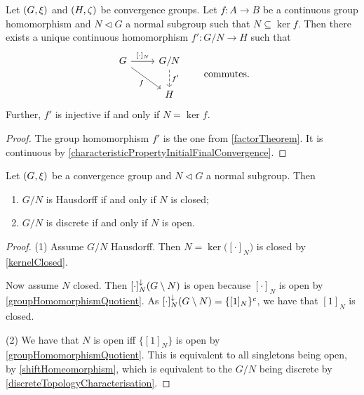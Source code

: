 \begin{lemma}
Let $\sSet{G, \xi}$ and $\sSet{H, \zeta}$ be convergence groups. Let $f: A\to B$ be a continuous group homomorphism and $N\lhd G$ a normal subgroup such that $N\subseteq \ker f$. Then there exists a unique continuous homomorphism $f': G/N \to H$ such that
\[ \begin{tikzcd}
G \arrow[r, "{[\cdot]_N}"] \arrow[dr, swap, "f"] & G/N \arrow[d, dashed, "{f'}"] \\
& H
\end{tikzcd} \qquad\text{commutes.} \]
Further, $f'$ is injective \textup{if and only if} $N = \ker f$.
\end{lemma}
\begin{proof}
The group homomorphism $f'$ is the one from \ref{factorTheorem}. It is continuous by \ref{characteristicPropertyInitialFinalConvergence}.
\end{proof}

\begin{proposition} \label{quotientConvergenceGroupProperties}
Let $\sSet{G, \xi}$ be a convergence group and $N \lhd G$ a normal subgroup. Then 
\begin{enumerate}
\item $G/N$ is Hausdorff \textup{if and only if} $N$ is closed;
\item $G/N$ is discrete \textup{if and only if} $N$ is open.
\end{enumerate}
\end{proposition}
\begin{proof}
(1) Assume $G/N$ Hausdorff. Then $N = \ker\big([\cdot]_N\big)$ is closed by \ref{kernelClosed}.

Now assume $N$ closed. Then $[\cdot]^{\downarrow}_N(G\setminus N)$ is open because $[\cdot]_N$ is open by \ref{groupHomomorphismQuotient}. As $[\cdot]^{\downarrow}_N(G\setminus N) = \{[1]_N\}^c$, we have that $[1]_N$ is closed.

(2) We have that $N$ is open iff $\{[1]_N\}$ is open by \ref{groupHomomorphismQuotient}. This is equivalent to all singletons being open, by \ref{shiftHomeomorphism}, which is equivalent to the $G/N$ being discrete by \ref{discreteTopologyCharacterisation}.
\end{proof}

